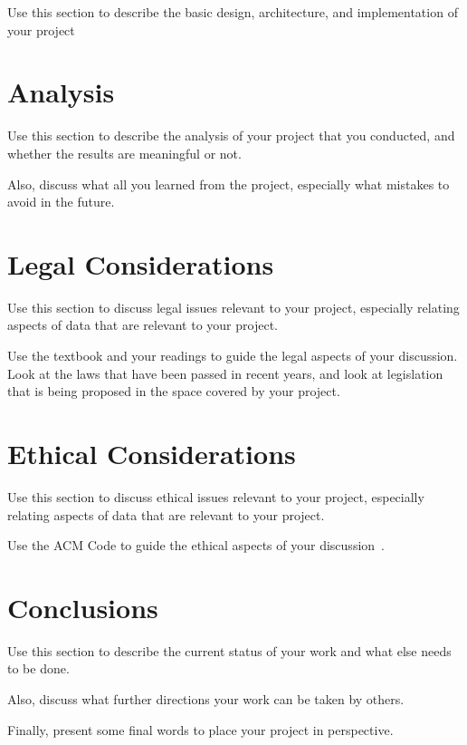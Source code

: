 \documentclass[sigconf, anonymous]{acmart}
\begin{document}
Use this section to describe the basic design, architecture, and
implementation of your project

\section{Analysis}
\label{analysis}
Use this section to describe the analysis of your project that you
conducted, and whether the results are meaningful or not.

Also, discuss what all you learned from the project, especially what
mistakes to avoid in the future.

\section{Legal Considerations}
\label{legal considerations}

Use this section to discuss legal issues relevant to your project,
especially relating aspects of data that are relevant to your project.

Use the textbook and your readings to guide the legal aspects of your
discussion. Look at the laws that have been passed in recent years,
and look at legislation that is being proposed in the space covered by
your project.

\section{Ethical Considerations}
\label{ethical considerations}

Use this section to discuss ethical issues relevant to your
project, especially relating aspects of data that are relevant to your
project.

Use the ACM Code to guide the ethical aspects of your
discussion~\cite{ACMCODE}.


\section{Conclusions}
\label{conclusions}

Use this section to describe the current status of your work
and what else needs to be done.

Also, discuss what further directions your work can be taken by
others.

Finally, present some final words to place your project in
perspective.

\balance
\end{document}
